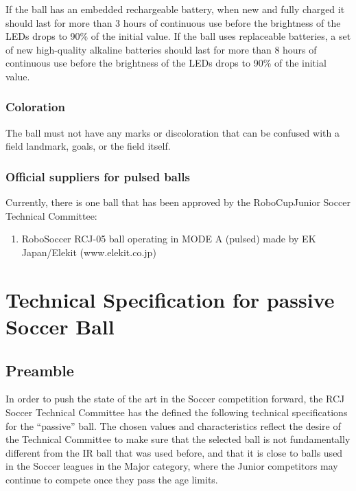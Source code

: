 \documentclass{article}
\begin{document}
If the ball has an embedded rechargeable battery, when new and fully charged it
should last for more than 3 hours of continuous use before the brightness of
the LEDs drops to 90\% of the initial value. If the ball uses replaceable
batteries, a set of new high-quality alkaline batteries should last for more
than 8 hours of continuous use before the brightness of the LEDs drops to 90\%
of the initial value.

\subsubsection{Coloration}

The ball must not have any marks or discoloration that can be confused with a field
landmark, goals, or the field itself.

\subsubsection{Official suppliers for pulsed balls}

Currently, there is one ball that has been approved by the RoboCupJunior Soccer
Technical Committee:

\begin{enumerate}
    \item RoboSoccer RCJ-05 ball operating in MODE A (pulsed) made by EK Japan/Elekit (www.elekit.co.jp)
\end{enumerate}

\section{Technical Specification for passive Soccer Ball\label{ref-passive-spec}}

\subsection{Preamble}

In order to push the state of the art in the Soccer competition forward, the
RCJ Soccer Technical Committee has the defined the following technical
specifications for the ``passive'' ball. The chosen values and characteristics
reflect the desire of the Technical Committee to make sure that the selected
ball is not fundamentally different from the IR ball that was used before, and
that it is close to balls used in the Soccer leagues in the Major category,
where the Junior competitors may continue to compete once they pass the age
limits.
\end{document}
